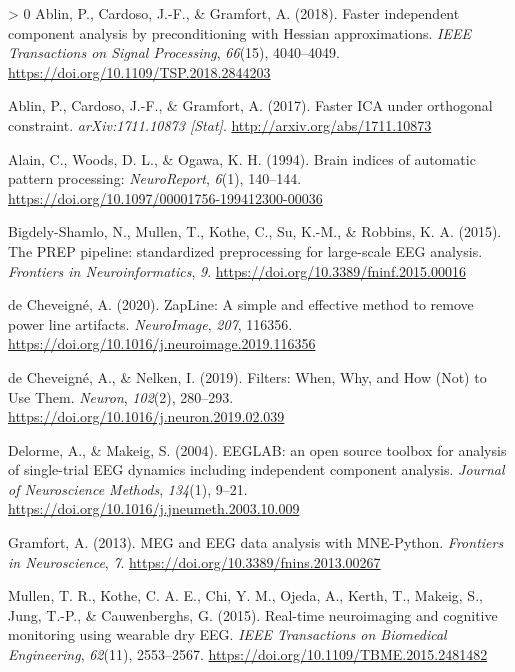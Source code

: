 \documentclass[twoside, man, a4paper,12pt, nofontenc]{apa7}
\newlength{\cslhangindent}
\newenvironment{CSLReferences}[3] %
 {%
  \setlength{\parindent}{0pt}
  \ifodd #1 \everypar{\setlength{\hangindent}{\cslhangindent}}\ignorespaces\fi
  \ifnum #2 > 0
  \setlength{\parskip}{#3\baselineskip}
  \fi
 }%
 {}
\begin{document}
\hypertarget{refs}{}
\begin{CSLReferences}{1}{0}
\leavevmode\hypertarget{ref-ablinFasterIndependentComponent2018}{}%
Ablin, P., Cardoso, J.-F., \& Gramfort, A. (2018). Faster independent
component analysis by preconditioning with Hessian approximations.
\emph{IEEE Transactions on Signal Processing}, \emph{66}(15),
4040--4049. \url{https://doi.org/10.1109/TSP.2018.2844203}

\leavevmode\hypertarget{ref-ablinFasterICAOrthogonal2017}{}%
Ablin, P., Cardoso, J.-F., \& Gramfort, A. (2017). Faster ICA under
orthogonal constraint. \emph{arXiv:1711.10873 {[}Stat{]}}.
\url{http://arxiv.org/abs/1711.10873}

\leavevmode\hypertarget{ref-alainBrainIndicesAutomatic1994}{}%
Alain, C., Woods, D. L., \& Ogawa, K. H. (1994). Brain indices of
automatic pattern processing: \emph{NeuroReport}, \emph{6}(1), 140--144.
\url{https://doi.org/10.1097/00001756-199412300-00036}

\leavevmode\hypertarget{ref-bigdely-shamloPREPPipelineStandardized2015}{}%
Bigdely-Shamlo, N., Mullen, T., Kothe, C., Su, K.-M., \& Robbins, K. A.
(2015). The PREP pipeline: standardized preprocessing for large-scale
EEG analysis. \emph{Frontiers in Neuroinformatics}, \emph{9}.
\url{https://doi.org/10.3389/fninf.2015.00016}

\leavevmode\hypertarget{ref-decheveigneZapLineSimpleEffective2020}{}%
de Cheveigné, A. (2020). ZapLine: A simple and effective method to
remove power line artifacts. \emph{NeuroImage}, \emph{207}, 116356.
\url{https://doi.org/10.1016/j.neuroimage.2019.116356}

\leavevmode\hypertarget{ref-decheveigneFiltersWhenWhy2019}{}%
de Cheveigné, A., \& Nelken, I. (2019). Filters: When, Why, and How
(Not) to Use Them. \emph{Neuron}, \emph{102}(2), 280--293.
\url{https://doi.org/10.1016/j.neuron.2019.02.039}

\leavevmode\hypertarget{ref-delormeEEGLABOpenSource2004}{}%
Delorme, A., \& Makeig, S. (2004). EEGLAB: an open source toolbox for
analysis of single-trial EEG dynamics including independent component
analysis. \emph{Journal of Neuroscience Methods}, \emph{134}(1), 9--21.
\url{https://doi.org/10.1016/j.jneumeth.2003.10.009}

\leavevmode\hypertarget{ref-gramfortMEGEEGData2013}{}%
Gramfort, A. (2013). MEG and EEG data analysis with MNE-Python.
\emph{Frontiers in Neuroscience}, \emph{7}.
\url{https://doi.org/10.3389/fnins.2013.00267}

\leavevmode\hypertarget{ref-mullenRealtimeNeuroimagingCognitive2015}{}%
Mullen, T. R., Kothe, C. A. E., Chi, Y. M., Ojeda, A., Kerth, T.,
Makeig, S., Jung, T.-P., \& Cauwenberghs, G. (2015). Real-time
neuroimaging and cognitive monitoring using wearable dry EEG. \emph{IEEE
Transactions on Biomedical Engineering}, \emph{62}(11), 2553--2567.
\url{https://doi.org/10.1109/TBME.2015.2481482}


\end{CSLReferences}
\end{document}

